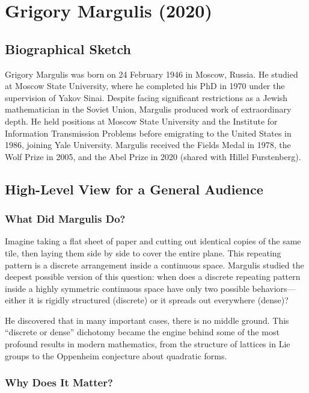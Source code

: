 \chapter{Grigory Margulis (2020)}

\section{Biographical Sketch}

Grigory Margulis was born on 24 February 1946 in Moscow, Russia. He studied at Moscow State University, where he completed his PhD in 1970 under the supervision of Yakov Sinai. Despite facing significant restrictions as a Jewish mathematician in the Soviet Union, Margulis produced work of extraordinary depth. He held positions at Moscow State University and the Institute for Information Transmission Problems before emigrating to the United States in 1986, joining Yale University. Margulis received the Fields Medal in 1978, the Wolf Prize in 2005, and the Abel Prize in 2020 (shared with Hillel Furstenberg).

\section{High-Level View for a General Audience}

\subsection{What Did Margulis Do?}

Imagine taking a flat sheet of paper and cutting out identical copies of the same tile, then laying them side by side to cover the entire plane. This repeating pattern is a discrete arrangement inside a continuous space. Margulis studied the deepest possible version of this question: when does a discrete repeating pattern inside a highly symmetric continuous space have only two possible behaviors---either it is rigidly structured (discrete) or it spreads out everywhere (dense)?

He discovered that in many important cases, there is no middle ground. This ``discrete or dense'' dichotomy became the engine behind some of the most profound results in modern mathematics, from the structure of lattices in Lie groups to the Oppenheim conjecture about quadratic forms.

\subsection{Why Does It Matter?}

